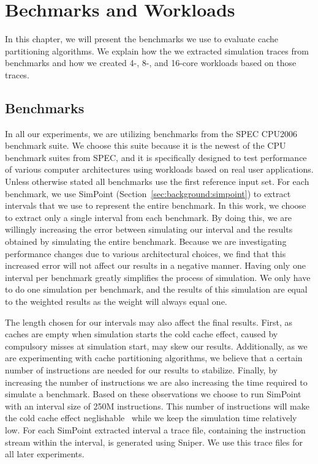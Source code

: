 
\chapter{Bechmarks and Workloads}
\label{cpt:benchmarks_workloads}

In this chapter, we will present the benchmarks we use to evaluate cache partitioning algorithms.
We explain how the we extracted simulation traces from benchmarks and how we created 4-, 8-, and 16-core workloads based on those traces.

\section{Benchmarks}

In all our experiments, we are utilizing benchmarks from the SPEC CPU2006~\cite{SPECCPU2006} benchmark suite. 
We choose this suite because it is the newest of the CPU benchmark suites from SPEC, and it is specifically designed to test performance of various computer architectures using workloads based on real user applications.
Unless otherwise stated all benchmarks use the first reference input set.
For each benchmark, we use SimPoint\cite{Hamerly2005} (Section~\ref{sec:background:simpoint}) to extract intervals that we use to represent the entire benchmark.
In this work, we choose to extract only a single interval from each benchmark.
By doing this, we are willingly increasing the error\cite{Hamerly2004} between simulating our interval and the results obtained by simulating the entire benchmark.
Because we are investigating performance changes due to various architectural choices, we find that this increased error will not affect our results in a negative manner.
Having only one interval per benchmark greatly simplifies the process of simulation.
We only have to do one simulation per benchmark, and the results of this simulation are equal to the weighted results as the weight will always equal one.

The length chosen for our intervals may also affect the final results.
First, as caches are empty when simulation starts the cold cache effect, caused by compulsory misses at simulation start, may skew our results.
Additionally, as we are experimenting with cache partitioning algorithms, we believe that a certain number of instructions are needed for our results to stabilize.
Finally, by increasing the number of instructions we are also increasing the time required to simulate a benchmark.
Based on these observations we choose to run SimPoint with an interval size of 250M instructions.
This number of instructions will make the cold cache effect neglishable~\cite{Hamerly2005,Hamerly2004,Olsen2014} while we keep the simulation time relatively low.
For each SimPoint extracted interval a trace file, containing the instruction stream within the interval, is generated using Sniper.
We use this trace files for all later experiments.

